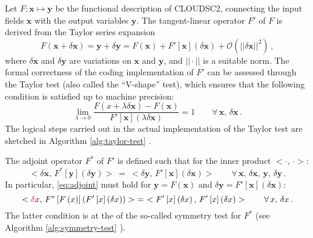 \documentclass[main.tex]{subfiles}
\begin{document}
        Let $F: \boldsymbol{x} \mapsto \boldsymbol{y}$ be the functional description of CLOUDSC2, connecting the input fields $\boldsymbol{x}$ with the output variables $\boldsymbol{y}$. The tangent-linear operator $F'$ of $F$ is derived from the Taylor series expansion
        \begin{equation}
            F \left( \boldsymbol{x} + \delta \boldsymbol{x} \right) = \boldsymbol{y} + \delta \boldsymbol{y} = F \left( \boldsymbol{x} \right) + F' \left[ \boldsymbol{x} \right] \left( \delta \boldsymbol{x} \right) + \mathcal{O} \left( ||\delta \boldsymbol{x} ||^2 \right) \, ,
        \end{equation}
        where $\delta \boldsymbol{x}$ and $\delta \boldsymbol{y}$ are variations on $\boldsymbol{x}$ and $\boldsymbol{y}$, and $|| \cdot ||$ is a suitable norm. The formal correctness of the coding implementation of $F'$ can be assessed through the Taylor test (also called the ``V-shape'' test), which ensures that the following condition is satisfied up to machine precision:
        \begin{equation}
            \lim_{\lambda \to 0} \dfrac{F \left( x + \lambda \delta \boldsymbol{x} \right) - F \left( \boldsymbol{x} \right)}{F' \left[ \boldsymbol{x} \right] \left( \lambda \delta \boldsymbol{x} \right)} = 1 \qquad \forall \, \boldsymbol{x}, \, \delta \boldsymbol{x} \, .
        \end{equation}
        The logical steps carried out in the actual implementation of the Taylor test are sketched in Algorithm \ref{alg:taylor-test} .
        
        The adjoint operator $F^*$ of $F'$ is defined such that for the inner product $< \cdot, \, \cdot >$:
        \begin{equation}
            \label{eq:adjoint}
            < \delta \boldsymbol{x}, \, F^* \left[ \boldsymbol{y} \right] \left( \delta \boldsymbol{y} \right) > ~ = ~ < \delta \boldsymbol{y}, \, F' \left[ \boldsymbol{x} \right] \left( \delta \boldsymbol{x} \right) > \qquad \forall \, \boldsymbol{x}, \, \delta \boldsymbol{x}, \, \boldsymbol{y}, \, \delta \boldsymbol{y} \, .
        \end{equation}
        In particular, \eqref{eq:adjoint} must hold for $\boldsymbol{y} = F \left( \boldsymbol{x} \right)$ and $\delta \boldsymbol{y} = F' \left[ \boldsymbol{x} \right] \left( \delta \boldsymbol{x} \right)$:
        \begin{equation}
            \label{eq:symmetry-test}
            < \textcolor{red}{\delta} \relax{x}, \, F^* \left[ F \left( \relax{x} \right) \right] \left( F' \left[ \relax{x} \right] \left( \delta \relax{x} \right) \right) > ~ = ~ < F' \left[ \relax{x} \right] \left( \delta \relax{x} \right), \, F' \left[ \relax{x} \right] \left( \delta \relax{x} \right) > \qquad \forall \, \relax{x}, \, \delta \relax{x} \, .
        \end{equation}
        The latter condition is at the  of the so-called symmetry test for $F^*$ (see Algorithm \ref{alg:symmetry-test} ).

\end{document}
